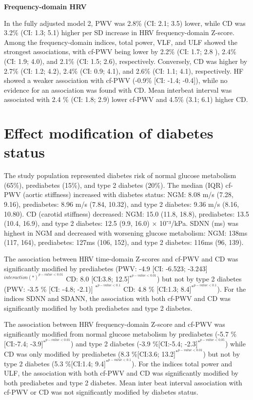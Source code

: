 \documentclass[
  a4paper,
  headsepline=true,
  open=any]{scrbook}
\begin{document}
\textbf{Frequency-domain HRV}

In the fully adjusted model 2, PWV was 2.8\% (CI: 2.1; 3.5) lower, while
CD was 3.2\% (CI: 1.3; 5.1) higher per SD increase in HRV
frequency-domain Z-score. Among the frequency-domain indices, total
power, VLF, and ULF showed the strongest associations, with cf-PWV being
lower by 2.2\% (CI: 1.7; 2.8 ), 2.4\% (CI: 1.9; 4.0), and 2.1\% (CI:
1.5; 2.6), respectively. Conversely, CD was higher by 2.7\% (CI: 1.2;
4.2), 2.4\% (CI: 0.9; 4.1), and 2.6\% (CI: 1.1; 4.1), respectively. HF
showed a weaker association with cf-PWV (-0.9\% {[}CI: -1.4; -0.4{]}),
while no evidence for an association was found with CD. Mean interbeat
interval was associated with 2.4 \% (CI: 1.8; 2.9) lower cf-PWV and
4.5\% (3.1; 6.1) higher CD.

\hypertarget{effect-modification-of-diabetes-status}{%
\section{Effect modification of diabetes
status}\label{effect-modification-of-diabetes-status}}

The study population represented diabetes risk of normal glucose
metabolism (65\%), prediabetes (15\%), and type 2 diabetes (20\%). The
median (IQR) cf-PWV (aortic stiffness) increased with diabetes status:
NGM: 8.08 m/s (7.28, 9.16), prediabetes: 8.96 m/s (7.84, 10.32), and
type 2 diabetes: 9.36 m/s (8.16, 10.80). CD (carotid stiffness)
decreased: NGM: 15.0 (11.8, 18.8), prediabetes: 13.5 (10.4, 16.9), and
type 2 diabetes: 12.5 (9.9, 16.0) × 10⁻³/kPa. SDNN (ms) was highest in
NGM and decreased with worsening glucose metabolism: NGM: 138ms (117,
164), prediabetes: 127ms (106, 152), and type 2 diabetes: 116ms (96,
139).

The association between HRV time-domain Z-scores and cf-PWV and CD was
significantly modified by prediabetes (PWV: -4.9 {[}CI: -6.523;
-3.243{]} \(^{interaction(*) ^{p-value< 0.01}}\) CD: 8.0 {[}CI:3.8;
12.5{]}\(^{*^{p-value< 0.01}}\)) but not by type 2 diabetes (PWV: -3.5
\% {[}CI: -4.8; -2.1){]} \(^{*^{p-value< 0.1}}\) CD: 4.8 \% {[}CI:1.3;
8.4{]}\(^{*^{p-value< 0.1}}\)). For the indices SDNN and SDANN, the
association with both cf-PWV and CD was significantly modified by both
prediabetes and type 2 diabetes.

The association between HRV frequency-domain Z-score and cf-PWV was
significantly modified from normal glucose metabolism by prediabetes
(-5.7 \%{[}CI:-7.4; -3.9{]}\(^{*^{p-value< 0.01}}\)) and type 2 diabetes
(-3.9 \%{[}CI:-5.4; -2.3{]}\(^{*^{p-value< 0.05}}\)) while CD was only
modified by prediabetes (8.3 \%{[}CI:3.6;
13.2{]}\(^{*^{p-value< 0.01}}\)) but not by type 2 diabetes (5.3
\%{[}CI:1.4; 9.4{]}\(^{*^{p-value< 0.1}}\)). For the indices total power
and ULF, the association with both cf-PWV and CD was significantly
modified by both prediabetes and type 2 diabetes. Mean inter beat
interval association with cf-PWV or CD was not significantly modified by
diabetes status.
\end{document}
